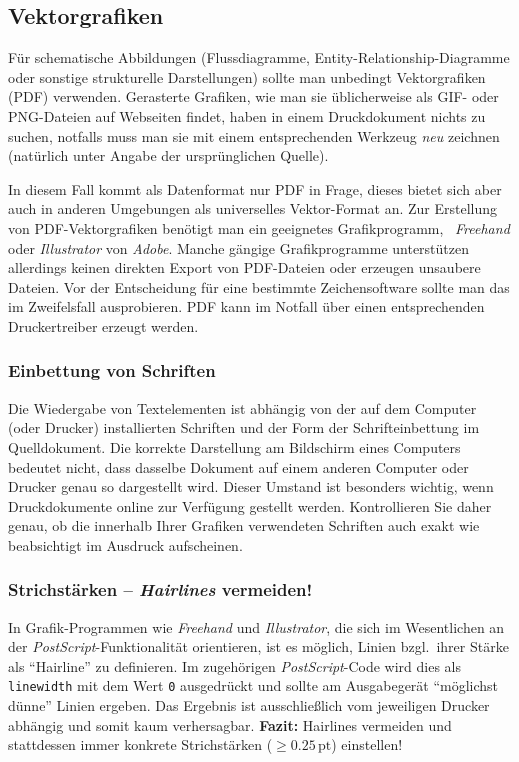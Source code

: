 \subsection{Vektorgrafiken}

Für schematische Abbildungen (\zB Flussdiagramme, Entity-Relationship-Diagramme
oder sonstige strukturelle Darstellungen) sollte man unbedingt
Vektorgrafiken (PDF) verwenden. %
Gerasterte Grafiken, wie man sie üblicherweise als GIF- oder PNG-Dateien
auf Webseiten findet, haben in einem Druckdokument nichts zu suchen, notfalls
muss man sie mit einem entsprechenden Werkzeug \emph{neu} zeichnen (natürlich
unter Angabe der ursprünglichen Quelle).

In diesem Fall kommt als Datenformat nur PDF %
in Frage,
dieses bietet sich aber auch in anderen Umgebungen als universelles
Vektor-Format an.
Zur Erstellung von PDF-Vektorgrafiken benötigt man ein geeignetes
Grafikprogramm, \zB\ \emph{Freehand} %
oder \emph{Illustrator} von \emph{Adobe}.
Manche gängige Grafikprogramme 
unterstützen allerdings keinen direkten Export von PDF-Dateien
oder erzeugen unsaubere Dateien. Vor der Entscheidung
für eine bestimmte Zeichensoftware sollte man das im Zweifelsfall
ausprobieren.
PDF kann im Notfall über einen entsprechenden Druckertreiber erzeugt werden.




\subsubsection{Einbettung von Schriften}

Die Wiedergabe von Textelementen ist abhängig von der auf dem
Computer (oder Drucker) installierten Schriften und der Form der
Schrifteinbettung im Quelldokument. Die korrekte Darstellung am
Bildschirm eines Computers bedeutet nicht, dass dasselbe Dokument
auf einem anderen Computer oder Drucker genau so dargestellt wird.
Dieser Umstand ist besonders wichtig, wenn Druckdokumente online
zur Verfügung gestellt werden. Kontrollieren Sie daher genau, ob
die innerhalb Ihrer Grafiken verwendeten Schriften auch exakt wie
beabsichtigt im Ausdruck aufscheinen.


\subsubsection{Strichstärken -- \emph{Hairlines} vermeiden!}

In Grafik-Programmen wie \emph{Freehand} und \emph{Illustrator},
die sich im Wesentlichen an der \emph{PostScript}-Funktionalität
orientieren, ist es möglich, Linien bzgl.\ ihrer Stärke als
"`Hairline"' zu definieren. Im zugehörigen \emph{PostScript}-Code
wird dies als \texttt{linewidth} mit dem Wert \texttt{0} ausgedrückt und
sollte am Ausgabegerät "`möglichst dünne"' Linien ergeben. Das
Ergebnis ist ausschließlich vom jeweiligen Drucker
abhängig und somit kaum verhersagbar.
\textbf{Fazit:} Hairlines vermeiden und stattdessen immer konkrete
Strichstärken ($\geq 0.25\,\mathrm{pt}$) einstellen!



